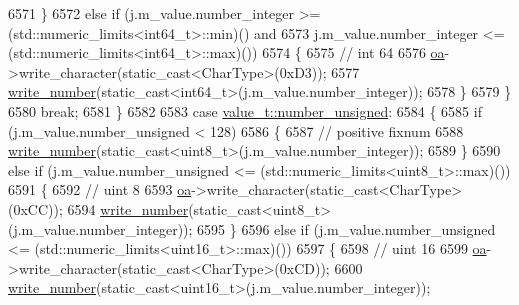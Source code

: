 \begin{DoxyCode}
6571                     \}
6572                     \textcolor{keywordflow}{else} \textcolor{keywordflow}{if} (j.m\_value.number\_integer >= (std::numeric\_limits<int64\_t>::min)() and
6573                              j.m\_value.number\_integer <= (std::numeric\_limits<int64\_t>::max)())
6574                     \{
6575                         \textcolor{comment}{// int 64}
6576                         \hyperlink{classnlohmann_1_1detail_1_1binary__writer_a6f15b782a7900f50ef37d123008e601b}{oa}->write\_character(static\_cast<CharType>(0xD3));
6577                         \hyperlink{classnlohmann_1_1detail_1_1binary__writer_a62cfd50a511371e718f37ad7bb29ae9d}{write\_number}(static\_cast<int64\_t>(j.m\_value.number\_integer));
6578                     \}
6579                 \}
6580                 \textcolor{keywordflow}{break};
6581             \}
6582 
6583             \textcolor{keywordflow}{case} \hyperlink{namespacenlohmann_1_1detail_a1ed8fc6239da25abcaf681d30ace4985adce7cc8ec29055c4158828921f2f265e}{value\_t::number\_unsigned}:
6584             \{
6585                 \textcolor{keywordflow}{if} (j.m\_value.number\_unsigned < 128)
6586                 \{
6587                     \textcolor{comment}{// positive fixnum}
6588                     \hyperlink{classnlohmann_1_1detail_1_1binary__writer_a62cfd50a511371e718f37ad7bb29ae9d}{write\_number}(static\_cast<uint8\_t>(j.m\_value.number\_integer));
6589                 \}
6590                 \textcolor{keywordflow}{else} \textcolor{keywordflow}{if} (j.m\_value.number\_unsigned <= (std::numeric\_limits<uint8\_t>::max)())
6591                 \{
6592                     \textcolor{comment}{// uint 8}
6593                     \hyperlink{classnlohmann_1_1detail_1_1binary__writer_a6f15b782a7900f50ef37d123008e601b}{oa}->write\_character(static\_cast<CharType>(0xCC));
6594                     \hyperlink{classnlohmann_1_1detail_1_1binary__writer_a62cfd50a511371e718f37ad7bb29ae9d}{write\_number}(static\_cast<uint8\_t>(j.m\_value.number\_integer));
6595                 \}
6596                 \textcolor{keywordflow}{else} \textcolor{keywordflow}{if} (j.m\_value.number\_unsigned <= (std::numeric\_limits<uint16\_t>::max)())
6597                 \{
6598                     \textcolor{comment}{// uint 16}
6599                     \hyperlink{classnlohmann_1_1detail_1_1binary__writer_a6f15b782a7900f50ef37d123008e601b}{oa}->write\_character(static\_cast<CharType>(0xCD));
6600                     \hyperlink{classnlohmann_1_1detail_1_1binary__writer_a62cfd50a511371e718f37ad7bb29ae9d}{write\_number}(static\_cast<uint16\_t>(j.m\_value.number\_integer));

\end{DoxyCode}
